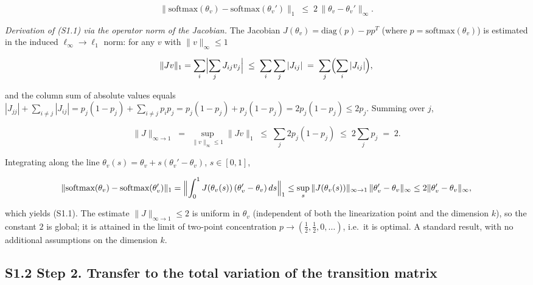 \documentclass[pdflatex,sn-mathphys-ay]{sn-jnl}
\begin{document}
\begin{equation}\|\text{softmax}(\theta_v) - \text{softmax}(\theta_v')\|_1 \;\le\; 2 \, \|\theta_v - \theta_v'\|_\infty. \tag{S1.1}\end{equation}



\emph{Derivation of (S1.1) via the operator norm of the Jacobian.} The Jacobian \(J(\theta_v) = \text{diag}(p) - p p^T\) (where \(p = \text{softmax}(\theta_v)\)) is estimated in the induced \(\ell_\infty \to \ell_1\) norm: for any \(v\) with \(\|v\|_\infty \le 1\)



\[\|J v\|_1 = \sum_i \Bigl|\sum_j J_{ij} v_j\Bigr| \;\le\; \sum_i \sum_j |J_{ij}| \;=\; \sum_j \Bigl(\sum_i |J_{ij}|\Bigr),\]



and the column sum of absolute values equals \(|J_{jj}| + \sum_{i \ne j}|J_{ij}| = p_j(1-p_j) + \sum_{i \ne j} p_i p_j = p_j(1-p_j) + p_j(1-p_j) = 2 p_j(1-p_j) \le 2 p_j\). Summing over \(j\),



\[\|J\|_{\infty \to 1} \;=\; \sup_{\|v\|_\infty \le 1}\|Jv\|_1 \;\le\; \sum_j 2 p_j(1-p_j) \;\le\; 2 \sum_j p_j \;=\; 2.\]



Integrating along the line \(\theta_v(s) = \theta_v + s(\theta_v'-\theta_v)\), \(s \in [0,1]\),



\[\|\text{softmax}(\theta_v) - \text{softmax}(\theta_v')\|_1 = \Bigl\|\int_0^1 J(\theta_v(s))\,(\theta_v'-\theta_v)\,ds\Bigr\|_1 \le \sup_s \|J(\theta_v(s))\|_{\infty\to 1}\,\|\theta_v'-\theta_v\|_\infty \le 2\|\theta_v'-\theta_v\|_\infty,\]



which yields (S1.1). The estimate \(\|J\|_{\infty\to 1}\le 2\) is uniform in \(\theta_v\) (independent of both the linearization point and the dimension \(k\)), so the constant \(2\) is global; it is attained in the limit of two-point concentration \(p \to (\tfrac12,\tfrac12,0,\dots)\), i.e.~it is optimal. A standard result, with no additional assumptions on the dimension \(k\).



\subsection*{S1.2 Step 2. Transfer to the total variation of the transition matrix}\label{s1.2-step-2.-transfer-to-the-total-variation-of-the-transition-matrix}
\end{document}
